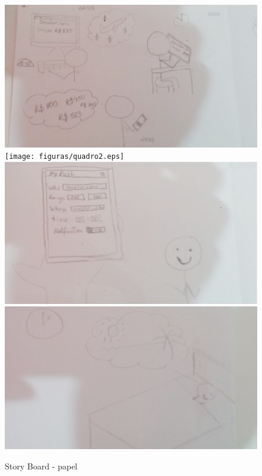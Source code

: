 \begin{figure}[H]
	\centering
	\label{fig01}
		\includegraphics[keepaspectratio=true,scale=0.3]{figuras/quadro1.eps}
		\texttt{[image: figuras/quadro2.eps]}
		\includegraphics[keepaspectratio=true,scale=0.3]{figuras/quadro3.eps}
		\includegraphics[keepaspectratio=true,scale=0.3]{figuras/quadro4.eps}
	\caption{Story Board - papel}
\end{figure}

